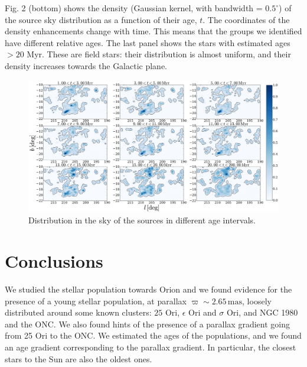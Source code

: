 \documentclass{mem}
\begin{document}
Fig. 2 (bottom) shows the density (Gaussian kernel, with bandwidth = $0.5^{\circ}$) of the source sky distribution as a function of their age, $t$.  
The coordinates of the density enhancements change with time. This means that the groups we identified have different relative ages.
The last panel shows the stars with estimated ages $> 20$ Myr. These are field stars: their distribution is almost uniform, and their density increases towards the Galactic plane. 
\begin{figure}
\includegraphics[width = \hsize]{fig7.eps}
\caption{Distribution in the sky of the sources in different age intervals. 
}
\end{figure}

\section{Conclusions}
We studied the stellar population towards Orion and we found evidence for the presence of a young stellar population, at parallax $\varpi \sim 2.65\,  \mathrm{mas}$, loosely distributed around some known clusters: $25$ Ori, $\epsilon$ Ori and $\sigma$ Ori, and NGC 1980 and the ONC. We also found hints of the presence of a parallax gradient going from 25 Ori to the ONC. We estimated the ages of the populations, and we found an age gradient corresponding to the parallax gradient. In particular, the closest stars to the Sun are also the oldest ones.
\end{document}
